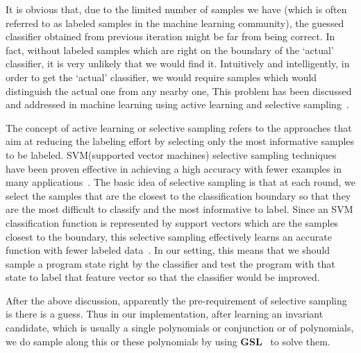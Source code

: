 It is obvious that, due to the limited number of samples we have (which is often referred to as labeled samples in the machine learning community), 
the guessed classifier obtained from previous iteration might be far from being correct. 
In fact, without labeled samples which are right on the boundary of the `actual' classifier, 
it is very unlikely that we would find it. 
Intuitively and intelligently, in order to get the `actual' classifier, 
we would require samples which would distinguish the actual one from any nearby one, 
This problem has been discussed and addressed in machine learning using active learning and selective sampling~\cite{DBLP:conf/icml/SchohnC00}.

The concept of active learning or selective sampling refers to the approaches 
that aim at reducing the labeling effort by selecting only the most informative samples to be labeled. 
SVM(supported vector machines) selective sampling techniques have been proven effective in achieving a high accuracy 
with fewer examples in many applications~\cite{DBLP:conf/mm/TongC01,DBLP:journals/jmlr/TongK01}. 
The basic idea of selective sampling is that at each round, we select the samples that are the closest to the classification boundary 
so that they are the most difficult to classify and the most informative to label. 
Since an SVM classification function is represented by support vectors which are the samples closest to the boundary, 
this selective sampling effectively learns an accurate function with fewer labeled data~\cite{DBLP:conf/icml/SchohnC00}. 
In our setting, this means that we should sample a program state right by the classifier and test the program 
with that state to label that feature vector so that the classifier would be improved.


After the above discussion, apparently the pre-requirement of selective sampling is there is a guess.
Thus in our implementation, after learning an invariant candidate, 
which is usually a single polynomials or conjunction or  of polynomials,
we do sample along this or these polynomials by using \textbf{GSL}~\cite{gough2009gnu} to solve them.

